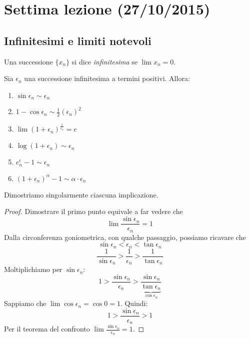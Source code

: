 \chapter{Settima lezione (27/10/2015)}

\section{Infinitesimi e limiti notevoli}

\begin{definition}
Una successione $\{x_n\}$ si dice \emph{infinitesima} se $\lim x_n = 0$.
\end{definition}

\begin{proposition}
Sia $\epsilon_n$ una successione infinitesima a termini positivi. Allora:
\begin{enumerate}
\item $\sin \epsilon_n \sim \epsilon_n$
\item $1 - \cos \epsilon_n \sim \frac{1}{2} (\epsilon_n)^2$
\item $\lim (1+\epsilon_n)^\frac{1}{\epsilon_n} = e$
\item $\log (1 + \epsilon_n) \sim \epsilon_n$
\item $e^\epsilon_n - 1 \sim \epsilon_n$
\item $(1+\epsilon_n)^\alpha - 1 \sim \alpha \cdot \epsilon_n$
\end{enumerate}
\end{proposition}

Dimostriamo singolarmente ciascuna implicazione.

\begin{proof}
Dimostrare il primo punto equivale a far vedere che
\begin{equation*}
\lim \frac{\sin \epsilon_n}{\epsilon_n} = 1
\end{equation*}
Dalla circonferenza goniometrica, con qualche passaggio, possiamo ricavare che
\begin{equation*}
\sin \epsilon_n < \epsilon_n < \tan \epsilon_n
\end{equation*}
\begin{equation*}
\frac{1}{\sin \epsilon_n} > \frac{1}{\epsilon_n} > \frac{1}{\tan \epsilon_n}
\end{equation*}
Moltiplichiamo per $\sin \epsilon_n$:
\begin{equation*}
1 > \frac{\sin \epsilon_n}{\epsilon_n} > \underbrace{\frac{\sin \epsilon_n}{\tan \epsilon_n}}_{\cos \epsilon_n}
\end{equation*}
Sappiamo che $\lim \cos \epsilon_n = \cos 0 = 1$. Quindi:
\begin{equation*}
1 > \frac{\sin \epsilon_n}{\epsilon_n} > 1
\end{equation*}
Per il teorema del confronto $\lim \frac{\sin \epsilon_n}{\epsilon_n} = 1$.
\end{proof}


